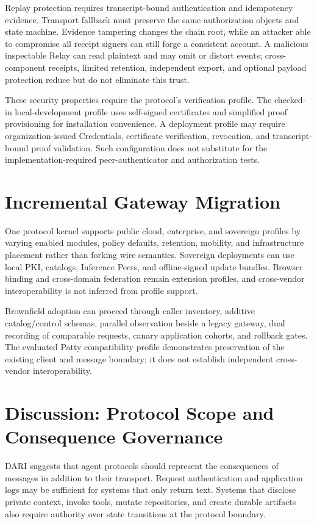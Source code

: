 \documentclass[10pt]{article}
\begin{document}
Replay protection requires transcript-bound authentication and idempotency evidence. Transport fallback must preserve the same authorization objects and state machine. Evidence tampering changes the chain root, while an attacker able to compromise all receipt signers can still forge a consistent account. A malicious inspectable Relay can read plaintext and may omit or distort events; cross-component receipts, limited retention, independent export, and optional payload protection reduce but do not eliminate this trust.

These security properties require the protocol's verification profile. The checked-in local-development profile uses self-signed certificates and simplified proof provisioning for installation convenience. A deployment profile may require organization-issued Credentials, certificate verification, revocation, and transcript-bound proof validation. Such configuration does not substitute for the implementation-required peer-authenticator and authorization tests.

\section{Incremental Gateway Migration}

One protocol kernel supports public cloud, enterprise, and sovereign profiles by varying enabled modules, policy defaults, retention, mobility, and infrastructure placement rather than forking wire semantics. Sovereign deployments can use local PKI, catalogs, Inference Peers, and offline-signed update bundles. Browser binding and cross-domain federation remain extension profiles, and cross-vendor interoperability is not inferred from profile support.

Brownfield adoption can proceed through caller inventory, additive catalog/control schemas, parallel observation beside a legacy gateway, dual recording of comparable requests, canary application cohorts, and rollback gates. The evaluated Patty compatibility profile demonstrates preservation of the existing client and message boundary; it does not establish independent cross-vendor interoperability.

\section{Discussion: Protocol Scope and Consequence Governance}

DARI suggests that agent protocols should represent the consequences of messages in addition to their transport. Request authentication and application logs may be sufficient for systems that only return text. Systems that disclose private context, invoke tools, mutate repositories, and create durable artifacts also require authority over state transitions at the protocol boundary.
\end{document}

